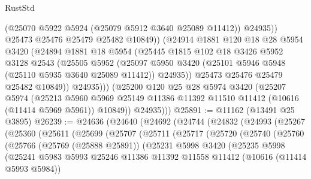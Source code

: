 \begin{lexlean}{RustStd}
\begin{coremodule}
                    (@25070 @5922 @5924 (@25079 @5912 @3640 @25089 @11412))
                    @24935))
                @25473
                @25476
                @25479
                @25482
                @10849))
            (@24914
              @1881
              @120
              @18
              @28
              @5954
              @3420
              (@24894
                @1881
                @18
                @5954
                (@25445
                  @1815
                  @102
                  @18
                  @3426
                  @5952
                  @3128
                  @2543
                  (@25505
                    @5952
                    (@25097
                      @5950
                      @3420
                      (@25101 @5946 @5948 (@25110 @5935 @3640 @25089 @11412))
                      @24935))
                  @25473
                  @25476
                  @25479
                  @25482
                  @10849))
              @24935)))
        (@25200
          @120
          @25
          @28
          @5974
          @3420
          (@25207
            @5974
            (@25213
              @5960
              @5969
              @25149
              @11386
              @11392
              @11510
              @11412
              (@10616 (@11414 @5969 @5961))
              @10849))
          @24935)))
@25891 := @11162 (@13491 @25 @3895)
@26239 := @24636
    (@24640
      (@24692
        (@24744
          (@24832
            (@24993
              (@25267
                (@25360
                  (@25611
                    (@25699
                      (@25707
                        (@25711
                          (@25717
                            (@25720
                              (@25740
                                (@25760
                                  (@25766
                                    (@25769 (@25888 @25891))
                                    (@25231
                                      @5998
                                      @3420
                                      (@25235
                                        @5998
                                        (@25241
                                          @5983
                                          @5993
                                          @25246
                                          @11386
                                          @11392
                                          @11558
                                          @11412
                                          (@10616 (@11414 @5993 @5984))

\end{coremodule}
\end{lexlean}

